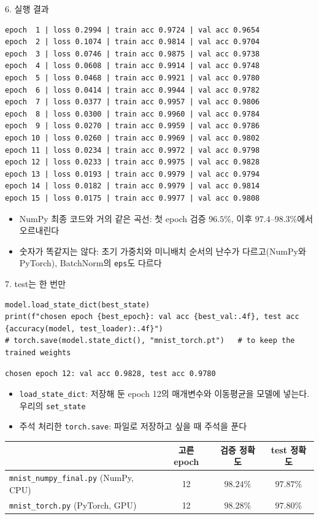 \documentclass[aspectratio=169,11pt]{beamer}
\newcommand{\codesmall}{\ttfamily\fontsize{7.4}{8.3}\selectfont}
\newcommand{\code}[1]{\texttt{#1}}
\begin{document}
\begin{frame}[fragile]{6. 실행 결과}
\begin{lstlisting}[style=outstyle,basicstyle=\codesmall]
epoch  1 | loss 0.2994 | train acc 0.9724 | val acc 0.9654
epoch  2 | loss 0.1074 | train acc 0.9814 | val acc 0.9704
epoch  3 | loss 0.0746 | train acc 0.9875 | val acc 0.9738
epoch  4 | loss 0.0608 | train acc 0.9914 | val acc 0.9748
epoch  5 | loss 0.0468 | train acc 0.9921 | val acc 0.9780
epoch  6 | loss 0.0414 | train acc 0.9944 | val acc 0.9782
epoch  7 | loss 0.0377 | train acc 0.9957 | val acc 0.9806
epoch  8 | loss 0.0300 | train acc 0.9960 | val acc 0.9784
epoch  9 | loss 0.0270 | train acc 0.9959 | val acc 0.9786
epoch 10 | loss 0.0260 | train acc 0.9969 | val acc 0.9802
epoch 11 | loss 0.0234 | train acc 0.9972 | val acc 0.9798
epoch 12 | loss 0.0233 | train acc 0.9975 | val acc 0.9828
epoch 13 | loss 0.0193 | train acc 0.9979 | val acc 0.9794
epoch 14 | loss 0.0182 | train acc 0.9979 | val acc 0.9814
epoch 15 | loss 0.0175 | train acc 0.9977 | val acc 0.9808
\end{lstlisting}
\small
\begin{itemize}
\item NumPy 최종 코드와 거의 같은 곡선: 첫 epoch 검증 $96.5\%$, 이후 $97.4$--$98.3\%$에서 오르내린다
\item 숫자가 똑같지는 않다: 초기 가중치와 미니배치 순서의 난수가 다르고(NumPy와 PyTorch), BatchNorm의 \code{eps}도 다르다
\end{itemize}
\end{frame}

\begin{frame}[fragile]{7. test는 한 번만}
\begin{lstlisting}
model.load_state_dict(best_state)
print(f"chosen epoch {best_epoch}: val acc {best_val:.4f}, test acc {accuracy(model, test_loader):.4f}")
# torch.save(model.state_dict(), "mnist_torch.pt")   # to keep the trained weights
\end{lstlisting}
\begin{lstlisting}[style=outstyle]
chosen epoch 12: val acc 0.9828, test acc 0.9780
\end{lstlisting}
\begin{itemize}
\item \code{load\_state\_dict}: 저장해 둔 epoch 12의 매개변수와 이동평균을 모델에 넣는다. 우리의 \code{set\_state}
\item 주석 처리한 \code{torch.save}: 파일로 저장하고 싶을 때 주석을 푼다
\end{itemize}
\vskip1mm
\centering
\small
\renewcommand{\arraystretch}{1.2}
\begin{tabular}{lccc}
\toprule
& \textbf{고른 epoch} & \textbf{검증 정확도} & \textbf{test 정확도} \\
\midrule
\code{mnist\_numpy\_final.py} (NumPy, CPU) & 12 & $98.24\%$ & $97.87\%$ \\
\code{mnist\_torch.py} (PyTorch, GPU) & 12 & $98.28\%$ & $97.80\%$ \\
\bottomrule
\end{tabular}
\end{frame}
\end{document}
